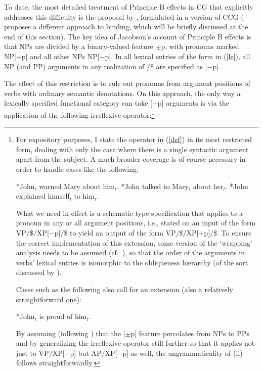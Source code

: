 \documentclass[output=paper]{langsci/langscibook}
\begin{document}
To date, the most detailed treatment of Principle B effects in CG that
explicitly addresses this difficulty is the proposal by
\citet{jacobson07}, formulated in a version of CCG
(\citet{Steedman97a} proposes a different approach to binding,
which will be briefly discussed at the end of this section). The key
idea of Jacobson's account of Principle B effects is that NPs are
divided by a binary-valued feature $\pm$p, with pronouns marked NP[+p]
and all other NPs NP[$-$p]. In all lexical entries of the form in
(\ref{le}), all NP (and PP) arguments in any realization of $/$\$ are
specified as [$-$p].

\begin{exe}
 \ex\label{le}
\end{exe}
The effect of this restriction is to rule out pronouns from argument
positions of verbs with ordinary semantic denotations. On this
approach, the only way a lexically specified functional category can
take [+p] arguments is via the application of the following
irreflexive operator:\footnote{For expository purposes, I state the
operator in (\ref{def}) in its most restricted form, dealing with only the
case where there is a single syntactic argument apart from the
subject. A much broader coverage is of course necessary in order to
handle cases like the following:

\begin{exe}
 \label{}
  \begin{xlist}
 \ex\label{}
    *John\ensuremath{_i} warned Mary about him\ensuremath{_i}.
 \ex\label{}
    *John talked to Mary\ensuremath{_i} about her\ensuremath{_i}.
 \ex\label{}
    *John explained himself\ensuremath{_i} to him\ensuremath{_i}.
  \end{xlist}
\end{exe}
What we need in effect is a schematic type specification that applies
to a pronoun in any or all argument positions, i.e., stated on an
input of the form VP\ensuremath{/}\$\ensuremath{/}XP[$-$p]\ensuremath{/}\$ to yield an output of 
the form VP\ensuremath{/}\$\ensuremath{/}XP[+p]\ensuremath{/}\$. To ensure the correct implementation
of this extension, some version of the `wrapping' analysis needs to be
assumed (cf.\ \citealt{jacobson07}), so that the order of the arguments in 
verbs' lexical entries is isomorphic to the obliqueness hierarchy (of
the sort discussed by \citet{PS92a}).

Cases such as the following also call for an extension (also a
relatively straightforward one):

\begin{exe}
 \label{}
  *John\ensuremath{_i} is proud of him\ensuremath{_i}.
\end{exe}
By assuming (following \citealt{jacobson07}) that the [$\pm$p] feature
percolates from NPs to PPs and by generalizing the irreflexive
operator still further so that it applies not just to VP\ensuremath{/}XP[$-$p] but
AP\ensuremath{/}XP[$-$p] as well, the ungrammaticality of (ii) follows
straightforwardly.}
\end{document}

